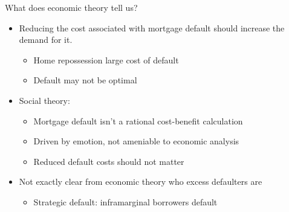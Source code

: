 \documentclass[ignorenonframetext,aspectratio=169]{beamer}
\providecommand{\tightlist}{%
  \setlength{\itemsep}{0pt}\setlength{\parskip}{0pt}}
\begin{document}
\begin{frame}{What does economic theory tell us?}

\begin{itemize}
\tightlist
\item
  Reducing the cost associated with mortgage default should increase the
  demand for it.

  \begin{itemize}
  \tightlist
  \item
    Home repossession large cost of default
  \item
    Default may not be optimal
  \end{itemize}
\item
  Social theory:

  \begin{itemize}
  \tightlist
  \item
    Mortgage default isn't a rational cost-benefit calculation
  \item
    Driven by emotion, not ameniable to economic analysis
  \item
    Reduced default costs should not matter
  \end{itemize}
\item
  Not exactly clear from economic theory who excess defaulters are

  \begin{itemize}
  \tightlist
  \item
    Strategic default: inframarginal borrowers default
  \end{itemize}
\end{itemize}

\end{frame}
\end{document}
